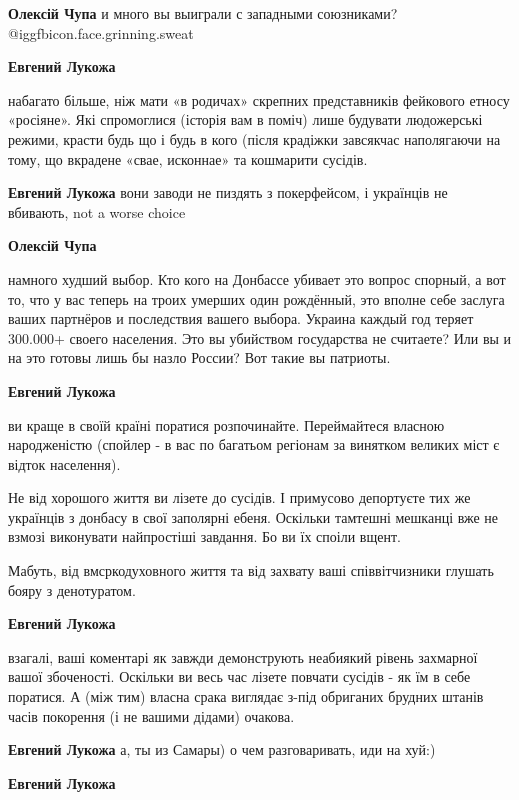 \begin{itemize}
\begin{itemize} %
\textbf{Олексій Чупа} и много вы выиграли с западными союзниками?  @igg{fbicon.face.grinning.sweat} 

\textbf{Евгений Лукожа} 

набагато більше, ніж мати «в родичах» скрепних представників фейкового етносу
«росіяне». Які спромоглися (історія вам в поміч) лише будувати людожерські
режими, красти будь що і будь в кого (після крадіжки завсякчас наполягаючи на
тому, що вкрадене «свае, исконнае» та кошмарити сусідів.

\textbf{Евгений Лукожа} вони заводи не пиздять з покерфейсом, і українців не вбивають, not a worse choice

\textbf{Олексій Чупа} 

намного худший выбор. Кто кого на Донбассе убивает это вопрос спорный, а вот
то, что у вас теперь на троих умерших один рождённый, это вполне себе заслуга
ваших партнёров и последствия вашего выбора. Украина каждый год теряет 300.000+
своего населения. Это вы убийством государства не считаете? Или вы и на это
готовы лишь бы назло России? Вот такие вы патриоты.

\textbf{Евгений Лукожа} 

ви краще в своїй країні поратися розпочинайте. Переймайтеся власною
народженістю (спойлер - в вас по багатьом регіонам за винятком великих міст є
відток населення).

Не від хорошого життя ви лізете до сусідів. І примусово депортуєте тих же
українців з донбасу в свої заполярні ебеня. Оскільки тамтешні мешканці вже не
взмозі виконувати найпростіші завдання. Бо ви їх споіли вщент.

Мабуть, від вмсркодуховного життя та від захвату ваші співвітчизники глушать
бояру з денотуратом.

\textbf{Евгений Лукожа} 

взагалі, ваші коментарі як завжди демонструють неабиякий рівень захмарної вашої
збоченості. Оскільки ви весь час лізете повчати сусідів - як їм в себе
поратися. А (між тим) власна срака виглядає з-під обриганих брудних штанів
часів покорення (і не вашими дідами) очакова.

\textbf{Евгений Лукожа} а, ты из Самары) о чем разговаривать, иди на хуй:)

\textbf{Евгений Лукожа} 


\end{itemize}
\end{itemize}

